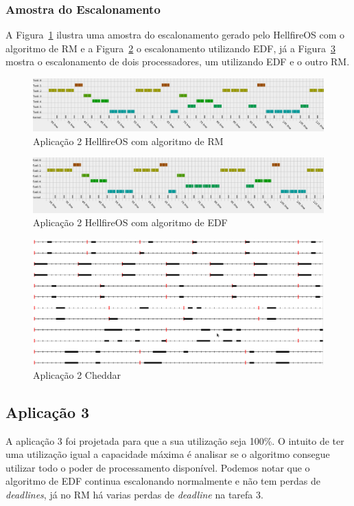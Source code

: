 \documentclass[12pt]{article}
\begin{document}
\subsubsection{Amostra do Escalonamento}

A Figura~\ref{fig:app2Hell} ilustra uma amostra do escalonamento gerado pelo HellfireOS com o algoritmo de RM e a Figura~\ref{fig:app2HellEDF} o escalonamento utilizando EDF, já a Figura~\ref{fig:app2Chedder} mostra o escalonamento de dois processadores, um utilizando EDF e o outro RM. 

\begin{figure}[ht]
\centering
\caption{Aplicação 2 HellfireOS com algoritmo de RM}
\label{fig:app2Hell}
\includegraphics[width=\columnwidth]{fig/app2HellSc.png}
\end{figure}

\begin{figure}[ht]
\centering
\caption{Aplicação 2 HellfireOS com algoritmo de EDF}
\label{fig:app2HellEDF}
\includegraphics[width=\columnwidth]{fig/app2HellScEDF.png}
\end{figure}

\begin{figure}[ht]
\centering
\caption{Aplicação 2 Cheddar}
\label{fig:app2Chedder}
\includegraphics[width=\columnwidth]{fig/app2CheSc.png}
\end{figure}

\subsection{Aplicação 3}
A aplicação 3 foi projetada para que a sua utilização seja 100\%. O intuito de ter uma utilização igual a capacidade máxima é analisar se o algoritmo consegue utilizar todo o poder de processamento disponível. Podemos notar que o algoritmo de EDF continua escalonando normalmente e não tem perdas de \textit{deadlines}, já no RM há varias perdas de \textit{deadline} na tarefa 3.
\end{document}
